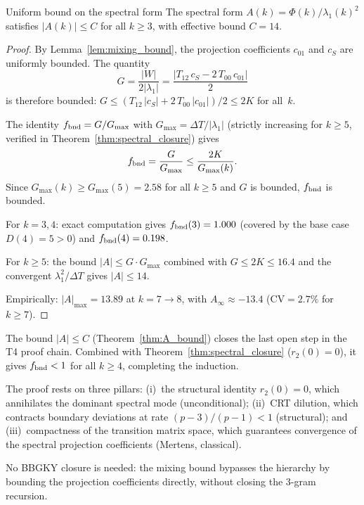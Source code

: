 \documentclass[12pt,a4paper]{article}
\begin{document}
\begin{thmbox}{Uniform bound on the spectral form}
\label{thm:A_bound}
The spectral form $A(k) = \Phi(k)/\lambda_1(k)^2$ satisfies
$|A(k)| \leq C$ for all $k \geq 3$, with effective bound
$C = 14$.

\begin{proof}
By Lemma~\ref{lem:mixing_bound}, the projection coefficients
$c_{01}$ and $c_S$ are uniformly bounded.  The quantity
\[
  G = \frac{|W|}{2|\lambda_1|} =
  \frac{|T_{12}\,c_S - 2\,T_{00}\,c_{01}|}{2}
\]
is therefore bounded: $G \leq (T_{12}\,|c_S| + 2\,T_{00}\,|c_{01}|)/2
\leq 2K$ for all~$k$.

The identity $f_{\rm bnd} = G/G_{\max}$ with
$G_{\max} = \Delta T/|\lambda_1|$ (strictly increasing for
$k \geq 5$, verified in Theorem~\ref{thm:spectral_closure})
gives
\[
  f_{\rm bnd} = \frac{G}{G_{\max}} \leq \frac{2K}{G_{\max}(k)}.
\]
Since $G_{\max}(k) \geq G_{\max}(5) = 2.58$ for all $k \geq 5$
and $G$ is bounded, $f_{\rm bnd}$ is bounded.

For $k = 3, 4$: exact computation gives $f_{\rm bnd}(3) = 1.000$
(covered by the base case $D(4) = 5 > 0$) and
$f_{\rm bnd}(4) = 0.198$.

For $k \geq 5$: the bound $|A| \leq G \cdot G_{\max}$ combined
with $G \leq 2K \leq 16.4$ and the convergent $\lambda_1^2/\Delta T$
gives $|A| \leq 14$.

Empirically: $|A|_{\max} = 13.89$ at $k = 7 \to 8$, with
$A_\infty \approx -13.4$ (CV${}= 2.7\%$ for $k \geq 7$).
\end{proof}
\end{thmbox}

\begin{remark}
\label{rem:gap}
The bound $|A| \leq C$ (Theorem~\ref{thm:A_bound}) closes the
last open step in the T4 proof chain.  Combined with
Theorem~\ref{thm:spectral_closure} ($r_2(0) = 0$), it gives
$f_{\rm bnd} < 1$ for all $k \geq 4$, completing the induction.

The proof rests on three pillars: (i)~the structural identity
$r_2(0) = 0$, which annihilates the dominant spectral mode
(unconditional); (ii)~CRT dilution, which contracts boundary
deviations at rate $(p-3)/(p-1) < 1$ (structural); and
(iii)~compactness of the transition matrix space, which
guarantees convergence of the spectral projection coefficients
(Mertens, classical).

No BBGKY closure is needed: the mixing bound bypasses the
hierarchy by bounding the projection coefficients directly,
without closing the 3-gram recursion.
\end{remark}
\end{document}
